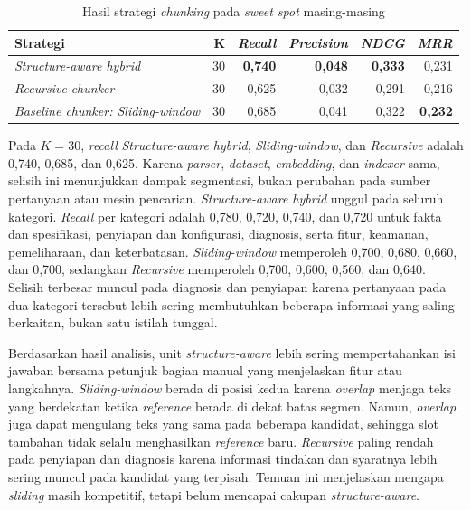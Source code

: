 \begin{table}[H]
\centering
\scriptsize
\caption{Hasil strategi \emph{chunking} pada \emph{sweet spot} masing-masing}
\label{tab:customer-chunking-results}
\begin{tabularx}{\textwidth}{@{}>{\RaggedRight\arraybackslash}p{3.7cm} r r r r r@{}}
\toprule
\textbf{Strategi} & \textbf{K} & \textbf{\emph{Recall}} & \textbf{\emph{Precision}} & \textbf{\emph{NDCG}} & \textbf{\emph{MRR}}\\
\midrule
\emph{Structure-aware hybrid} & 30 & \textbf{0,740} & \textbf{0,048} & \textbf{0,333} & 0,231\\
\emph{Recursive} \emph{chunker} & 30 & 0,625 & 0,032 & 0,291 & 0,216\\
\emph{Baseline chunker: Sliding-window} & 30 & 0,685 & 0,041 & 0,322 & \textbf{0,232}\\
\bottomrule
\end{tabularx}
\end{table}

Pada \(K = 30\), \emph{recall} \emph{Structure-aware hybrid}, \emph{Sliding-window}, dan
\emph{Recursive} adalah 0,740, 0,685, dan 0,625. Karena \emph{parser}, \emph{dataset}, \emph{embedding}, dan
\emph{indexer} sama, selisih ini menunjukkan dampak segmentasi, bukan perubahan pada sumber
pertanyaan atau mesin pencarian. \emph{Structure-aware hybrid} unggul pada seluruh kategori.
\emph{Recall} per kategori adalah 0,780, 0,720, 0,740, dan 0,720 untuk fakta dan spesifikasi,
penyiapan dan konfigurasi, diagnosis, serta fitur, keamanan, pemeliharaan, dan keterbatasan.
\emph{Sliding-window} memperoleh 0,700, 0,680, 0,660, dan 0,700, sedangkan
\emph{Recursive} memperoleh 0,700, 0,600, 0,560, dan 0,640. Selisih terbesar muncul pada
diagnosis dan penyiapan karena pertanyaan pada dua kategori tersebut lebih sering membutuhkan
beberapa informasi yang saling berkaitan, bukan satu istilah tunggal.

Berdasarkan hasil analisis, unit \emph{structure-aware} lebih sering mempertahankan isi
jawaban bersama petunjuk bagian manual yang menjelaskan fitur atau langkahnya. \emph{Sliding-window}
berada di posisi kedua karena \emph{overlap} menjaga teks yang berdekatan ketika \emph{reference} berada di
dekat batas segmen. Namun, \emph{overlap} juga dapat mengulang teks yang sama pada beberapa kandidat,
sehingga slot tambahan tidak selalu menghasilkan \emph{reference} baru. \emph{Recursive} paling rendah pada
penyiapan dan diagnosis karena informasi tindakan dan syaratnya lebih sering muncul pada
kandidat yang terpisah. Temuan ini menjelaskan mengapa \emph{sliding} masih kompetitif, tetapi belum
mencapai cakupan \emph{structure-aware}.

